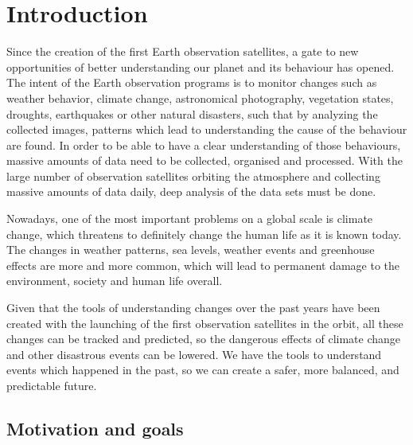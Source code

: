 \documentclass[12pt, a4paper]{report}
\begin{document}
	\tableofcontents{}
	\listoffigures{}
	\listoftables{}
	
	\newpage{}
	
	\chapter{Introduction} 
	
	Since the creation of the first Earth observation satellites, a gate to new opportunities of better understanding our planet and its behaviour has opened. The intent of the Earth observation programs is to monitor changes such as weather behavior, climate change, astronomical photography, vegetation states, droughts, earthquakes or other natural disasters, such that by analyzing the collected images, patterns which lead to understanding the cause of the behaviour are found. In order to be able to have a clear understanding of those behaviours, massive amounts of data need to be collected, organised and processed. With the large number of observation satellites orbiting the atmosphere and collecting massive amounts of data daily, deep analysis of the data sets must be done.
	
	Nowadays, one of the most important problems on a global scale is climate change, which threatens to definitely change the human life as it is known today. The changes in weather patterns, sea levels, weather events and greenhouse effects are more and more common, which will lead to permanent damage to the environment, society and human life overall.
	
	Given that the tools of understanding changes over the past years have been created with the launching of the first observation satellites in the orbit, all these changes can be tracked and predicted, so the dangerous effects of climate change and other disastrous events can be lowered.
	We have the tools to understand events which happened in the past, so we can create a safer, more balanced, and predictable future.
	
	\setcounter{page}{1}
	
	
	\section{Motivation and goals} 
	
\end{document}
